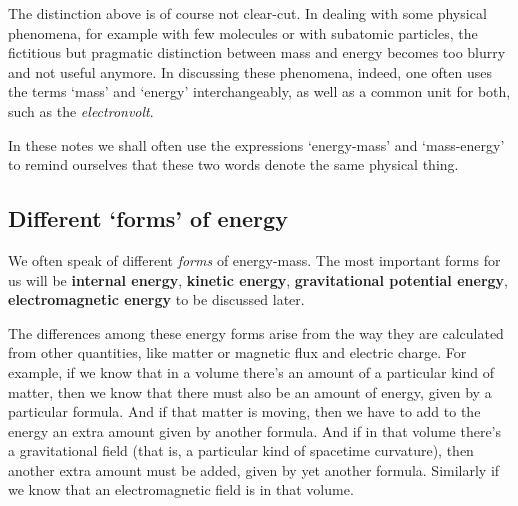 \documentclass[a4paper,12pt,%
onecolumn,oneside,%
british%
]{memoir}
\providecommand{\href}[2]{#2}
\renewcommand*{\|}[1][]{\nonscript\:#1\vert\nonscript\:\mathopen{}}
\newcommand*{\furl}[2]{\href{#1}{#2}\pagenote{\url{#1}}}
\newcommand*{\energym}{energy-mass}
\newcommand*{\masse}{mass-energy}
\begin{document}
\medskip

The distinction above is of course not clear-cut. In dealing with some physical phenomena, for example with few molecules or with subatomic particles, the fictitious but pragmatic distinction between mass and energy becomes too blurry and not useful anymore. In discussing these phenomena, indeed, one often uses the terms \enquote*{mass} and \enquote*{energy} interchangeably, as well as a common unit for both, such as the \furl{https://home.cern/tags/13-tev}{\emph{electronvolt}}.

\medskip

In these notes we shall often use the expressions \enquote*{\energym} and \enquote*{\masse} to remind ourselves that these two words denote the same physical thing.

\subsection{Different \enquote*{forms} of energy}
\label{sec:forms_energy}

We often speak of different \emph{forms} of \energym. The most important forms for us will be \textbf{internal energy}, \textbf{kinetic energy}, \textbf{gravitational potential energy}, \textbf{electromagnetic energy} to be discussed later.

The differences among these energy forms arise from the way they are calculated from other quantities, like matter or magnetic flux and electric charge. For example, if we know that in a volume there's an amount of a particular kind of matter, then we know that there must also be an amount of energy, given by a particular formula. And if that matter is moving, then we have to add to the energy an extra amount given by another formula. And if in that volume there's a gravitational field (that is, a particular kind of spacetime curvature), then another extra amount must be added, given by yet another formula. Similarly if we know that an electromagnetic field is in that volume.
\end{document}
